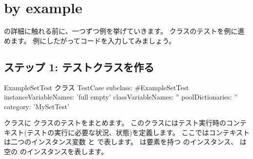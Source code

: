 \documentclass[a4paper,10pt,twoside]{book}
\begin{document}



\section{\sunit by example}

\SUnit の詳細に触れる前に、一つずつ例を挙げていきます。
 クラスのテストを例に進めます。
例にしたがってコードを入力してみましょう。
\subsection{ステップ 1: テストクラスを作る}


\begin{classdef}[exampleSetTest]{ExampleSetTest クラス}
TestCase subclass: #ExampleSetTest
	instanceVariableNames: 'full empty'
	classVariableNames: ''
	poolDictionaries: ''
	category: 'MySetTest'
\end{classdef}

 クラスに  クラスのテストをまとめます。
このクラスにはテスト実行時のコンテキスト(テストの実行に必要な状況、状態)を定義します。
ここではコンテキストは二つのインスタンス変数  と  で表します。
 は要素を持つ  のインスタンス、 は空の  のインスタンスを表します。
\end{document}
